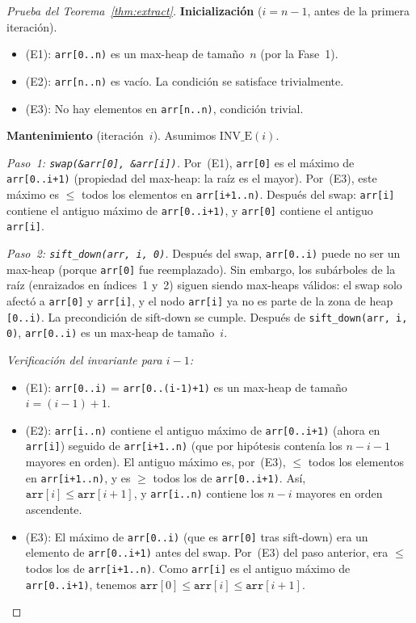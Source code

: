\documentclass[11pt, letterpaper]{article}
\theoremstyle{definition}
\theoremstyle{plain}
\theoremstyle{remark}
\begin{document}
\begin{proof}[Prueba del Teorema~\ref{thm:extract}]
\textbf{Inicialización} ($i = n - 1$, antes de la primera iteración).
\begin{itemize}
  \item (E1): \texttt{arr[0..n)} es un max-heap de tamaño~$n$ (por la
    Fase~1). \checkmark
  \item (E2): \texttt{arr[n..n)} es vacío. La condición se satisface
    trivialmente. \checkmark
  \item (E3): No hay elementos en \texttt{arr[n..n)}, condición
    trivial. \checkmark
\end{itemize}

\textbf{Mantenimiento} (iteración~$i$). Asumimos $\text{INV\_E}(i)$.

\emph{Paso~1: \texttt{swap(\&arr[0], \&arr[i])}.} Por~(E1),
\texttt{arr[0]} es el máximo de \texttt{arr[0..i+1)} (propiedad del
max-heap: la raíz es el mayor). Por~(E3), este máximo es $\leq$ todos
los elementos en \texttt{arr[i+1..n)}. Después del swap:
\texttt{arr[i]} contiene el antiguo máximo de \texttt{arr[0..i+1)}, y
\texttt{arr[0]} contiene el antiguo \texttt{arr[i]}.

\emph{Paso~2: \texttt{sift\_down(arr, i, 0)}.} Después del swap,
\texttt{arr[0..i)} puede no ser un max-heap (porque \texttt{arr[0]}
fue reemplazado). Sin embargo, los subárboles de la raíz (enraizados
en índices~1 y~2) siguen siendo max-heaps válidos: el swap solo afectó
a \texttt{arr[0]} y \texttt{arr[i]}, y el nodo \texttt{arr[i]} ya no
es parte de la zona de heap \texttt{[0..i)}. La precondición de
sift-down se cumple. Después de \texttt{sift\_down(arr, i, 0)},
\texttt{arr[0..i)} es un max-heap de tamaño~$i$.

\emph{Verificación del invariante para $i - 1$:}
\begin{itemize}
  \item (E1): \texttt{arr[0..i)} = \texttt{arr[0..(i{-}1)+1)} es un
    max-heap de tamaño $i = (i{-}1)+1$. \checkmark
  \item (E2): \texttt{arr[i..n)} contiene el antiguo máximo de
    \texttt{arr[0..i+1)} (ahora en \texttt{arr[i]}) seguido de
    \texttt{arr[i+1..n)} (que por hipótesis contenía los $n-i-1$
    mayores en orden). El antiguo máximo es, por~(E3), $\leq$ todos
    los elementos en \texttt{arr[i+1..n)}, y es $\geq$ todos los de
    \texttt{arr[0..i+1)}. Así, $\texttt{arr}[i] \leq \texttt{arr}[i+1]$,
    y \texttt{arr[i..n)} contiene los $n-i$ mayores en orden
    ascendente. \checkmark
  \item (E3): El máximo de \texttt{arr[0..i)} (que es \texttt{arr[0]}
    tras sift-down) era un elemento de \texttt{arr[0..i+1)} antes del
    swap. Por~(E3) del paso anterior, era $\leq$ todos los de
    \texttt{arr[i+1..n)}. Como \texttt{arr[i]} es el antiguo máximo de
    \texttt{arr[0..i+1)}, tenemos
    $\texttt{arr}[0] \leq \texttt{arr}[i] \leq \texttt{arr}[i+1]$.
    \checkmark
\end{itemize}


\end{proof}
\end{document}
